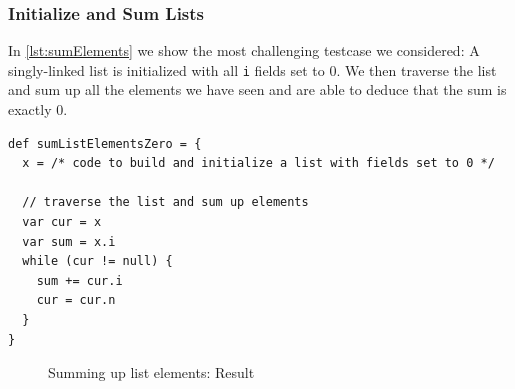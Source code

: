 \documentclass[11pt,a4paper,english]{article}
\begin{document}
\subsubsection{Initialize and Sum Lists}
In \autoref{lst:sumElements} we show the most challenging testcase we considered:
A singly-linked list is initialized with all \texttt{i} fields set to 0. We then
traverse the list and sum up all the elements we have seen and are able to
deduce that the sum is exactly 0.


\begin{lstlisting}[float,caption={Sum list elements
  testcase},label={lst:sumElements}]
def sumListElementsZero = {
  x = /* code to build and initialize a list with fields set to 0 */

  // traverse the list and sum up elements
  var cur = x
  var sum = x.i
  while (cur != null) {
    sum += cur.i
    cur = cur.n
  } 	  
}
\end{lstlisting}

\begin{figure}
  \begin{center}

  
  \end{center}
  \caption{Summing up list elements: Result}
  \label{fig:zerosumResult}
\end{figure}
\end{document}
